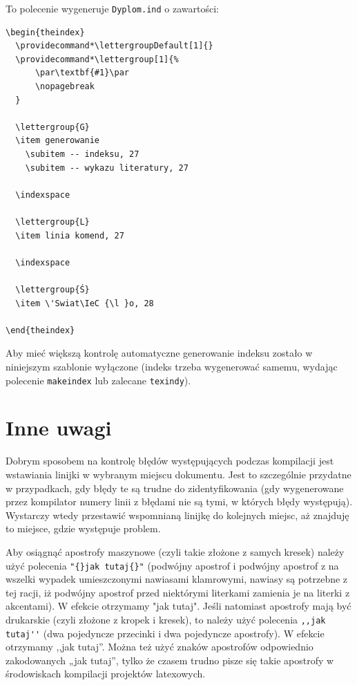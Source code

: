 \begin{itemize}
To polecenie wygeneruje \texttt{Dyplom.ind} o zawartości:
\begin{lstlisting}[basicstyle=\footnotesize\ttfamily]
\begin{theindex}
  \providecommand*\lettergroupDefault[1]{}
  \providecommand*\lettergroup[1]{%
      \par\textbf{#1}\par
      \nopagebreak
  }

  \lettergroup{G}
  \item generowanie
    \subitem -- indeksu, 27
    \subitem -- wykazu literatury, 27

  \indexspace

  \lettergroup{L}
  \item linia komend, 27

  \indexspace

  \lettergroup{Ś}
  \item \'Swiat\IeC {\l }o, 28

\end{theindex}
\end{lstlisting}


\end{itemize}


Aby mieć większą kontrolę automatyczne generowanie indeksu zostało w niniejszym szablonie wyłączone (indeks trzeba wygenerować samemu, wydając polecenie \texttt{makeindex} lub zalecane \texttt{texindy}).

\section{Inne uwagi}
Dobrym sposobem na kontrolę błędów występujących podczas kompilacji jest wstawiania linijki \verb?? w wybranym miejscu dokumentu. Jest to szczególnie przydatne w przypadkach, gdy błędy te są trudne do zidentyfikowania (gdy wygenerowane przez kompilator numery linii z błędami nie są tymi, w których błędy występują). Wystarczy wtedy przestawić wspomnianą linijkę do kolejnych miejsc, aż znajduję to miejsce, gdzie występuje problem.

Aby osiągnąć apostrofy maszynowe (czyli takie złożone z samych kresek) należy użyć polecenia \verb?"{}jak tutaj{}"? (podwójny apostrof i podwójny apostrof z na wszelki wypadek umieszczonymi nawiasami klamrowymi, nawiasy są potrzebne z tej racji, iż podwójny apostrof przed niektórymi literkami zamienia je na literki z akcentami). W efekcie otrzymamy "{}jak tutaj{}". Jeśli natomiast apostrofy mają być drukarskie (czyli złożone z kropek i kresek), to należy użyć polecenia \verb?,,jak tutaj''? (dwa pojedyncze przecinki i dwa pojedyncze apostrofy). W efekcie otrzymamy ,,jak tutaj''. Można też użyć znaków apostrofów odpowiednio zakodowanych „jak tutaj”, tylko że czasem trudno pisze się takie apostrofy w środowiskach kompilacji projektów latexowych.


